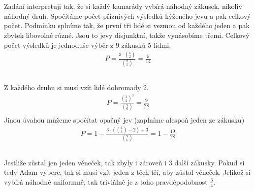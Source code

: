 \documentclass[a4paper]{article}
\begin{document}
\thispagestyle{fancy} %
{}

\section{}
\subsection{}
Zadání interpretuji tak, že si každý kamarády vybírá náhodný zákusek, nikoliv náhodný druh.
Spočítáme počet příznivých výsledků kýženého jevu a pak celkový počet. Podmínku splníme tak, že první tři lidé si vezmou od každého jeden a pak zbytek libovolné různé. Jsou to jevy disjunktní, takže vynásobíme třemi. Celkový počet výsledků je jednoduše výběr z $9$ zákusků $5$ lidmi.
\begin{align*}
	P = \frac{3 \cdot {6 \choose 2}}{{9 \choose 5}} = \frac{5}{14}	
\end{align*}

\subsection{}
Z každého druhu si musí vzít lidé dohromady 2.
\begin{align*}
	P = \frac{{3 \choose 2}^3}{{9 \choose 6}} = \frac{9}{28} \\	
\end{align*}
Jinou úvahou můžeme spočítat opačný jev (zaplníme alespoň jeden ze zákusků)
\begin{align*}
	P = 1-\frac{3 \cdot ({6 \choose 3}-2 )+3}{{ 9 \choose 6}} = 1 - \frac{19}{28}
\end{align*}

\subsection{}
Jestliže zůstal jen jeden věneček, tak zbyly i zároveň i 3 další zákusky. Pokud si tedy Adam vybere, tak si musí vzít jeden z těch tří, aby zůstal věneček. Jelikož si vybírá náhodně uniformně, tak triviálně je z toho pravděpodobnost $\frac{3}{4}$.

\newpage
\section{}
\end{document}
